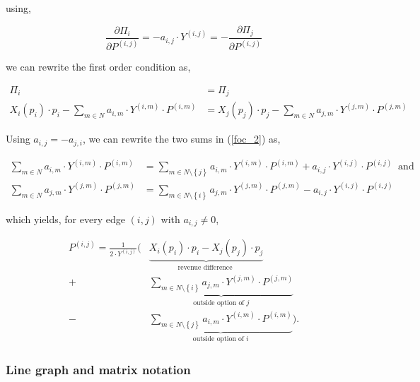\documentclass[american]{scrartcl}
\newcommand{\set}[1]{\left\{#1\right\}}
\begin{document}
using,

\begin{equation}
	\frac{\partial\Pi_i}{\partial P^{(i, j)}} = - a_{i, j} \cdot Y^{(i, j)} = -\frac{\partial \Pi_j}{\partial P^{(i, j)}}
\end{equation}

we can rewrite the first order condition as,

\begin{equation} \label{foc_2}
	\begin{split}
		\Pi_i &= \Pi_j \\
		X_i(p_i)\cdot p_i - \sum_{m \in N} a_{i, m} \cdot Y^{(i, m)} \cdot P^{(i, m)} &= X_j(p_j)\cdot p_j - \sum_{m \in N} a_{j, m} \cdot Y^{(j, m)} \cdot P^{(j, m)}
	\end{split}
\end{equation}

Using $a_{i, j} = - a_{j, i}$, we can rewrite the two sums in (\ref{foc_2}) as,

\begin{equation}
	\begin{split}
		\sum_{m \in N} a_{i, m} \cdot Y^{(i, m)} \cdot P^{(i, m)} &= \sum_{m \in N \setminus \set{j}}  a_{i, m} \cdot Y^{(i, m)} \cdot P^{(i, m)} + a_{i, j} \cdot Y^{(i, j)} \cdot P^{(i, j)} \ \text{ and }\\
		\sum_{m \in N} a_{j, m} \cdot Y^{(j, m)} \cdot P^{(j, m)} &=  \sum_{m \in N \setminus \set{i}}  a_{j, m} \cdot Y^{(j, m)} \cdot P^{(j, m)} - a_{i, j} \cdot Y^{(i, j)} \cdot P^{(i, j)}
	\end{split}
\end{equation}

which yields, for every edge $(i, j)$ with $ a_{i, j} \neq 0$,

\begin{equation} \label{solution}
	\begin{split}
		P^{(i, j)} = \frac{1}{2\cdot Y^{(i, j)}} \Biggl( &\underbrace{X_i(p_i)\cdot p_i - X_j(p_j)\cdot p_j}_{\text{revenue difference }}
		\\  + &\underbrace{\sum_{m\in N\setminus \set{i}} a_{j, m} \cdot Y^{(j, m)} \cdot P^{(j, m)}}_{\text{outside option of } j}
		\\ - & \underbrace{\sum_{m \in N\setminus \set{j}} a_{i, m} \cdot Y^{(i, m)} \cdot P^{(i, m)}}_{\text{outside option of } i} \Biggr).
	\end{split}
\end{equation}

\subsubsection{Line graph and matrix notation}
\end{document}
